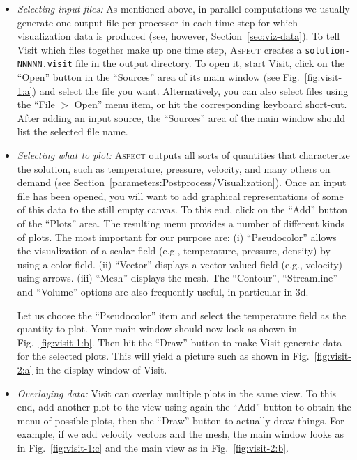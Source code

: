 \documentclass{article}
\newcommand{\aspect}{\textsc{Aspect}}
\begin{document}
\begin{itemize}
\item \textit{Selecting input files:} As mentioned above, in parallel
  computations we usually generate one output file per processor in each time
  step for which visualization data is produced (see, however,
  Section~\ref{sec:viz-data}). To tell Visit which files together make up one
  time step, \aspect{} creates a \texttt{solution-NNNNN.visit} file in the
  output directory. To open it, start Visit, click on the ``Open'' button in
  the ``Sources'' area of
  its main window (see Fig.~\ref{fig:visit-1:a}) and select the file you
  want. Alternatively, you can also select files using the ``File $>$ Open''
  menu item, or hit the corresponding keyboard short-cut. After adding an
  input source, the ``Sources'' area of the main window should list the
  selected file name.

\item \textit{Selecting what to plot:} \aspect{} outputs all sorts of
  quantities that characterize the solution, such as temperature, pressure,
  velocity, and many others on demand (see
  Section~\ref{parameters:Postprocess/Visualization}). Once an input file has
  been opened, you will want to add graphical representations of some of this
  data to the still empty canvas. To this end, click on the ``Add'' button of
  the ``Plots'' area. The resulting menu provides a number of different kinds
  of plots. The most important for our purpose are: (i) ``Pseudocolor'' allows
  the visualization of a scalar field (e.g., temperature, pressure, density)
  by using a color field. (ii) ``Vector'' displays a vector-valued field
  (e.g., velocity) using arrows. (iii) ``Mesh'' displays the mesh. The
  ``Contour'', ``Streamline'' and ``Volume'' options are also frequently
  useful, in particular in 3d.

  Let us choose the ``Pseudocolor'' item and select the temperature field as
  the quantity to plot. Your main window should now look as shown in
  Fig.~\ref{fig:visit-1:b}. Then hit the ``Draw'' button to make Visit generate
  data for the selected plots. This will yield a picture such as shown in
  Fig.~\ref{fig:visit-2:a} in the display window of Visit.

\item \textit{Overlaying data:} Visit can overlay multiple plots in the same
  view. To this end, add another plot to the view using again the ``Add''
  button to obtain the menu of possible plots, then the ``Draw'' button to
  actually draw things. For example, if we add velocity vectors and the mesh,
  the main window looks as in Fig.~\ref{fig:visit-1:c} and the main view as in
  Fig.~\ref{fig:visit-2:b}.


\end{itemize}
\end{document}
